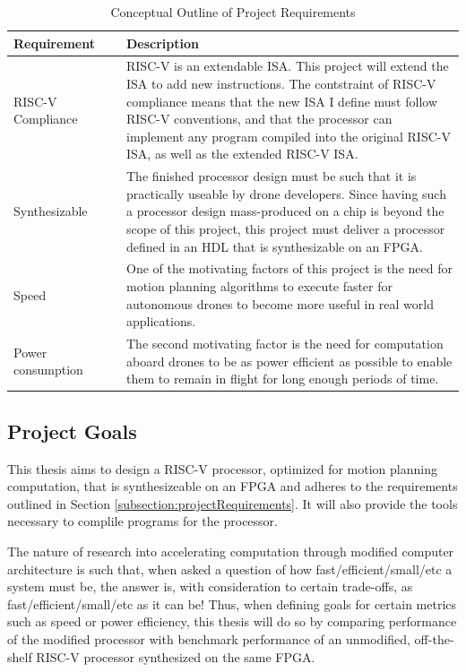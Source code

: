 \documentclass[11pt, oneside]{article}      %
\begin{document}
\begin{table}[h]
\begin{centering}
\begin{tabular}{| m{0.25\linewidth} | m{0.75\linewidth} |}
\hline
\textbf{Requirement}       & \textbf{Description} \\
\hline
RISC-V Compliance   & RISC-V is an extendable \ac{ISA}. This project will extend the \ac{ISA} to add new instructions. The contstraint of RISC-V compliance means that the new ISA I define must follow RISC-V conventions, and that the processor can implement any program compiled into the original RISC-V ISA, as well as the extended RISC-V ISA.\\
\hline
Synthesizable       & The finished processor design must be such that it is practically useable by drone developers. Since having such a processor design mass-produced on a chip is beyond the scope of this project, this project must deliver a processor defined in an \ac{HDL} that is synthesizable on an FPGA.\\
\hline
Speed               & One of the motivating factors of this project is the need for motion planning algorithms to execute faster for autonomous drones to become more useful in real world applications. \\
\hline
Power consumption   & The second motivating factor is the need for computation aboard drones to be as power efficient as possible to enable them to remain in flight for long enough periods of time.\\
\hline
\end{tabular}
\caption{Conceptual Outline of Project Requirements}
\label{table:projectRequirements}
\end{centering}
\end{table}

\subsection{Project Goals} \label{subsection:projectGoals}
This thesis aims to design a RISC-V processor, optimized for motion planning computation, that is synthesizeable on an \ac{FPGA} and adheres to the requirements outlined in Section \ref{subsection:projectRequirements}. It will also provide the tools necessary to complile programs for the processor. 

The nature of research into accelerating computation through modified computer architecture is such that, when asked a question of how fast/efficient/small/etc a system must be, the answer is, with consideration to certain trade-offs, as fast/efficient/small/etc as it can be! Thus, when defining goals for certain metrics such as speed or power efficiency, this thesis will do so by comparing performance of the modified processor with benchmark performance of an unmodified, off-the-shelf RISC-V processor synthesized on the same \ac{FPGA}.
\end{document}
